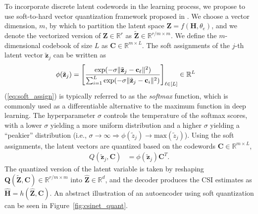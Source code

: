 To incorporate discrete latent codewords in the learning process, we propose to use soft-to-hard vector quantization framework proposed in \cite{ref:Agustsson2017SoftToHard}. We choose a vector dimension, $m$, by which to partition the latent space $\mathbf Z = f(\mathbf H, \theta_e)$, and we denote the vectorized version of $\mathbf Z \in \mathbb R^{r}$ as $\tilde{\mathbf Z} \in \mathbb R^{r/m \times m}$. We define the $m$-dimensional codebook of size $L$ as $\mathbf C \in \mathbb R^{m\times L}$. The soft assignments of the $j$-th latent vector $\tilde{\mathbf z}_j$ can be written as
\begin{align}
\phi(\tilde{\mathbf z}_j) &= \left[\frac{\text{exp}(-\sigma \Arrowvert \tilde{\mathbf z}_j - \mathbf c_\ell\Arrowvert^2)}{\sum_{i=1}^L\text{exp}(-\sigma \Arrowvert \tilde{\mathbf z}_j - \mathbf c_i\Arrowvert^2)}\right]_{\ell\in [L]} \in \mathbb R^L \label{eq:soft_assign}
\end{align}
(\ref{eq:soft_assign}) is typically referred to as the \emph{softmax} function, which is commonly used as a differentiable alternative to the maximum function in deep learning. The hyperparameter $\sigma$ controls the temperature of the softmax scores, with a lower $\sigma$ yielding a more uniform distribution and a higher $\sigma$ yielding a ``peakier'' distribution (i.e., $\sigma \to \infty \Rightarrow \phi(\tilde z_j) \to \text{max}(\tilde z_j)$). Using the soft assignments, the latent vectors are quantized based on the codewords $\mathbf C \in \mathbb R^{m \times L}$,
\begin{align}
Q(\tilde{\mathbf z}_j,\mathbf C) &= \phi(\tilde{\mathbf z}_j) \mathbf C^T. \label{eq:soft_quant}
\end{align}
The quantized version of the latent variable is taken by reshaping $\mathbf Q(\tilde{\mathbf Z},\mathbf C) \in \mathbb R^{r/m \times m}$ into $\hat{\mathbf Z} \in \mathbb R^d$, and the decoder produces the CSI estimates as $\hat{\mathbf H} = h(\hat{\mathbf Z}, \mathbf C)$. An abstract illustration of an autoencoder using soft quantization can be seen in Figure~\ref{fig:csinet_quant}.


